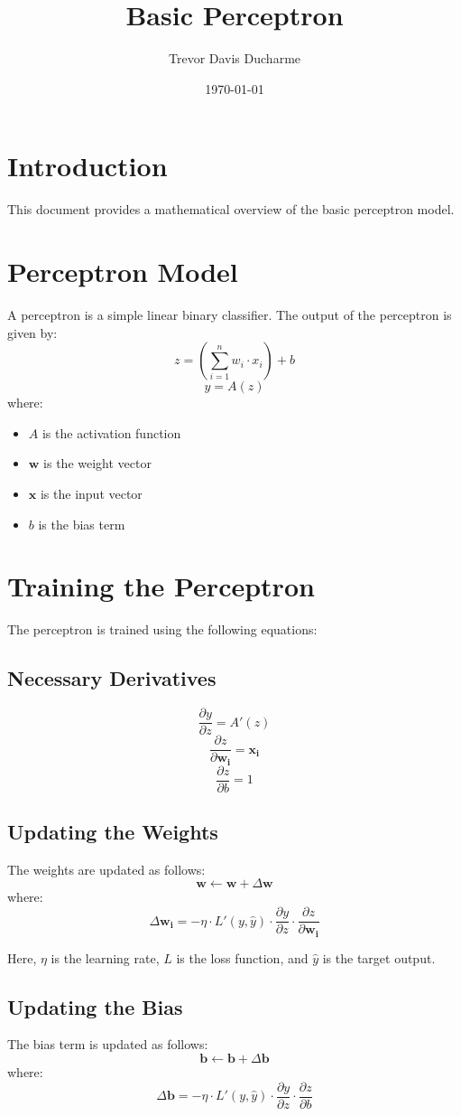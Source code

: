 \documentclass{article}
\title{Basic Perceptron}
\author{Trevor Davis Ducharme}
\date{\today}
\begin{document}
\maketitle

\section{Introduction}
This document provides a mathematical overview of the basic perceptron model.

\section{Perceptron Model}
A perceptron is a simple linear binary classifier. The output of the perceptron is given by:
\[
	z = \left(\sum_{i=1}^{n} w_i \cdot x_i\right) + b
\]
\[
	y = A(z)
\]
where:
\begin{itemize}
	\item $A$ is the activation function
	\item $\mathbf{w}$ is the weight vector
	\item $\mathbf{x}$ is the input vector
	\item $b$ is the bias term
\end{itemize}

\section{Training the Perceptron}
The perceptron is trained using the following equations:
\subsection{Necessary Derivatives}
\[
	\frac{\partial y}{\partial z} = A'(z)
\]
\[
	\frac{\partial z}{\partial \mathbf{w_i}} = \mathbf{x_i}
\]
\[
	\frac{\partial z}{\partial b} = 1
\]
\subsection{Updating the Weights}
The weights are updated as follows:
\[
\mathbf{w} \leftarrow \mathbf{w} + \Delta \mathbf{w}
\]
where:
\[
	\Delta \mathbf{w_i} = -\eta \cdot L'(y, \hat{y}) \cdot \frac{\partial y}{\partial z} \cdot \frac{\partial z}{\partial \mathbf{w_i}}
\]

Here, $\eta$ is the learning rate, $L$ is the loss function, and $\hat{y}$ is the target output.

\subsection{Updating the Bias}
The bias term is updated as follows:
\[
\mathbf{b} \leftarrow \mathbf{b} + \Delta \mathbf{b}
\]
where:
\[
	\Delta \mathbf{b} = -\eta \cdot L'(y, \hat{y}) \cdot \frac{\partial y}{\partial z} \cdot \frac{\partial z}{\partial b}
\]
\end{document}
